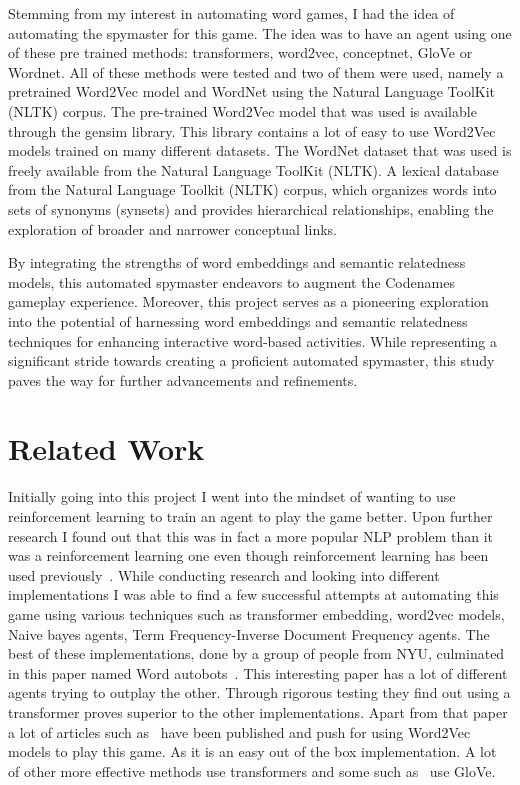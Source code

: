 \documentclass[11pt,a4paper]{article}
\begin{document}
Stemming from my interest in automating word games, I had the idea of automating the spymaster for this game. The idea was to have an agent using one of these pre trained methods: transformers, word2vec, conceptnet, GloVe or Wordnet. All of these methods were tested and two of them were used, namely a pretrained Word2Vec model and WordNet using the Natural Language ToolKit (NLTK) corpus. The pre-trained Word2Vec model that was used is available through the gensim library. This library contains a lot of easy to use Word2Vec models trained on many different datasets. The WordNet dataset that was used is freely available from the Natural Language ToolKit (NLTK). A lexical database from the Natural Language Toolkit (NLTK) corpus, which organizes words into sets of synonyms (synsets) and provides hierarchical relationships, enabling the exploration of broader and narrower conceptual links. 

By integrating the strengths of word embeddings and semantic relatedness models, this automated spymaster endeavors to augment the Codenames gameplay experience. Moreover, this project serves as a pioneering exploration into the potential of harnessing word embeddings and semantic relatedness techniques for enhancing interactive word-based activities. While representing a significant stride towards creating a proficient automated spymaster, this study paves the way for further advancements and refinements.


\section{Related Work}

Initially going into this project I went into the mindset of wanting to use reinforcement learning to train an agent to play the game better. Upon further research I found out that this was in fact a more popular NLP problem than it was a reinforcement learning one even though reinforcement learning has been used previously~\citep{siu-2022}. 
While conducting research and  looking into different implementations I was able to find a few successful attempts at automating this game using various techniques such as transformer embedding, word2vec models, Naive bayes agents, Term Frequency-Inverse Document Frequency agents. The best of these implementations, done by a group of people from NYU, culminated in this paper named Word autobots~\citep{jaramillo-2020}. This interesting paper has a lot of different agents trying to outplay the other. Through rigorous testing they find out using a transformer proves superior to the other implementations. 
Apart from that paper a lot of articles such as~\citep{neiman-2021} have been published and push for using Word2Vec models to play this game. As it is an easy out of the box implementation. A lot of other more effective methods use transformers and some such as~\citep{thomasahle-no-date} use GloVe. 
\end{document}
